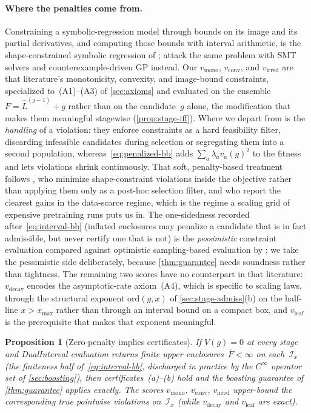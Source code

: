 \documentclass[11pt]{article}
\newcommand{\calI}{\mathcal{I}}
\newcommand{\Lhat}{\hat{L}}
\theoremstyle{plain}
\newtheorem{proposition}{Proposition}
\theoremstyle{remark}
\begin{document}
\paragraph{Where the penalties come from.}
Constraining a symbolic-regression model through bounds on its image and its partial derivatives, and computing those bounds with interval arithmetic, is the shape-constrained symbolic regression of \citet{kronberger2022shape}; \citet{bladek2019formal} attack the same problem with SMT solvers and counterexample-driven GP instead.
Our $v_{\mathrm{mono}}$, $v_{\mathrm{conv}}$, and $v_{\mathrm{irred}}$ are that literature's monotonicity, convexity, and image-bound constraints, specialized to~(A1)--(A3) of \cref{sec:axioms} and evaluated on the ensemble $F = \Lhat^{(j-1)} + g$ rather than on the candidate~$g$ alone, the modification that makes them meaningful stagewise (\cref{prop:stage-iff}).
Where we depart from \citet{kronberger2022shape} is the \emph{handling} of a violation: they enforce constraints as a hard feasibility filter, discarding infeasible candidates during selection or segregating them into a second population, whereas~\eqref{eq:penalized-bb} adds $\sum_a \lambda_a v_a(g)^2$ to the fitness and lets violations shrink continuously.
That soft, penalty-based treatment follows \citet{martinek2024penalized}, who minimize shape-constraint violations inside the objective rather than applying them only as a post-hoc selection filter, and who report the clearest gains in the data-scarce regime, which is the regime a scaling grid of expensive pretraining runs puts us in.
The one-sidedness recorded after~\eqref{eq:interval-bb} (inflated enclosures may penalize a candidate that is in fact admissible, but never certify one that is not) is the \emph{pessimistic} constraint evaluation compared against optimistic sampling-based evaluation by \citet{haider2022optimistic}; we take the pessimistic side deliberately, because \cref{thm:guarantee} needs soundness rather than tightness.
The remaining two scores have no counterpart in that literature: $v_{\mathrm{decay}}$ encodes the asymptotic-rate axiom~(A4), which is specific to scaling laws, through the structural exponent $\mathrm{ord}(g,x)$ of \cref{sec:stage-admiss}(b) on the half-line $x > x_{\max}$ rather than through an interval bound on a compact box, and $v_{\mathrm{leaf}}$ is the prerequisite that makes that exponent meaningful.
\begin{proposition}[Zero-penalty implies certificates]\label{prop:soft}
If $V(g)=0$ at every stage \emph{and} DualInterval evaluation returns finite upper
enclosures~$\overline{F}<\infty$ on each~$\calI_x$ (the finiteness half of~\eqref{eq:interval-bb},
discharged in practice by the $C^\infty$ operator set of \cref{sec:boosting}), then certificates~(a)--(b) hold and the boosting guarantee of \cref{thm:guarantee} applies exactly.
The scores $v_{\mathrm{mono}}$, $v_{\mathrm{conv}}$, $v_{\mathrm{irred}}$ upper-bound the corresponding true pointwise violations on~$\calI_x$ (while $v_{\mathrm{decay}}$ and $v_{\mathrm{leaf}}$ are exact).
\end{proposition}
\end{document}
